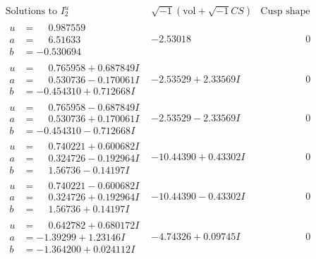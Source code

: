 \documentclass[1p]{elsarticle_modified}
\theoremstyle{definition}
\newcommand{\I}{\sqrt{-1}}
\begin{document}
$$\begin{array}{c|c|c}  
\text{Solutions to }I^u_{2}& \I (\text{vol} + \sqrt{-1}CS) & \text{Cusp shape}\\
 \hline 
\begin{aligned}
u &= \phantom{-}0.987559\phantom{ +0.000000I} \\
a &= \phantom{-}6.51633\phantom{ +0.000000I} \\
b &= -0.530694\phantom{ +0.000000I}\end{aligned}
 & -2.53018\phantom{ +0.000000I} & \phantom{-0.000000 } 0 \\ \hline\begin{aligned}
u &= \phantom{-}0.765958 + 0.687849 I \\
a &= \phantom{-}0.530736 - 0.170061 I \\
b &= -0.454310 + 0.712668 I\end{aligned}
 & -2.53529 + 2.33569 I & \phantom{-0.000000 } 0 \\ \hline\begin{aligned}
u &= \phantom{-}0.765958 - 0.687849 I \\
a &= \phantom{-}0.530736 + 0.170061 I \\
b &= -0.454310 - 0.712668 I\end{aligned}
 & -2.53529 - 2.33569 I & \phantom{-0.000000 } 0 \\ \hline\begin{aligned}
u &= \phantom{-}0.740221 + 0.600682 I \\
a &= \phantom{-}0.324726 - 0.192964 I \\
b &= \phantom{-}1.56736 - 0.14197 I\end{aligned}
 & -10.44390 + 0.43302 I & \phantom{-0.000000 } 0 \\ \hline\begin{aligned}
u &= \phantom{-}0.740221 - 0.600682 I \\
a &= \phantom{-}0.324726 + 0.192964 I \\
b &= \phantom{-}1.56736 + 0.14197 I\end{aligned}
 & -10.44390 - 0.43302 I & \phantom{-0.000000 } 0 \\ \hline\begin{aligned}
u &= \phantom{-}0.642782 + 0.680172 I \\
a &= -1.39299 + 1.23146 I \\
b &= -1.364200 + 0.024112 I\end{aligned}
 & -4.74326 + 0.09745 I & \phantom{-0.000000 } 0 \\ \hline\begin{aligned}

\end{aligned}
\end{array}$$
\end{document}
